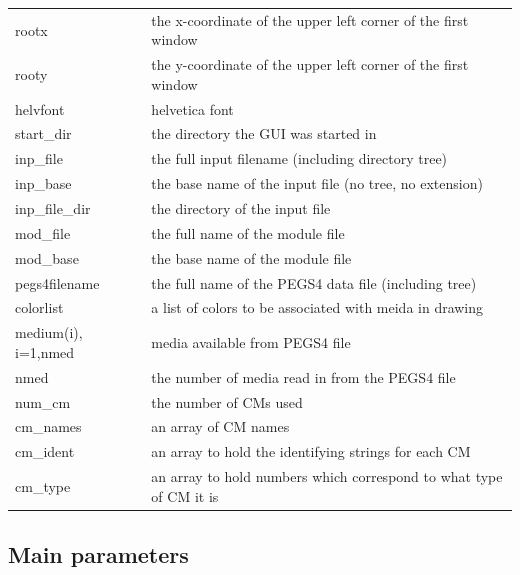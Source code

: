 \documentclass[12pt]{book}
\begin{document}
\begin{tabular}{|p{4.5cm}|p{11.5cm}|}\hline
rootx & the x-coordinate of the upper left corner of the first window \\
rooty & the y-coordinate of the upper left corner of the first window \\
helvfont & helvetica font \\
start\_dir & the directory the GUI was started in \\
inp\_file & the full input filename (including directory tree)\\
inp\_base & the base name of the input file (no tree, no extension) \\
inp\_file\_dir & the directory of the input file \\
mod\_file & the full name of the module file \\
mod\_base & the base name of the module file \\
pegs4filename & the full name of the PEGS4 data file (including tree) \\
colorlist & a list of colors to be associated with meida in drawing \\
medium(i), i=1,nmed & media available from PEGS4 file \\
nmed & the number of media read in from the PEGS4 file \\
num\_cm & the number of CMs used \\
cm\_names & an array of CM names \\
cm\_ident & an array to hold the identifying strings for each CM \\
cm\_type & an array to hold numbers which correspond to what type of CM
it is \\ \hline
\end{tabular}

\subsection{Main parameters}
\end{document}
